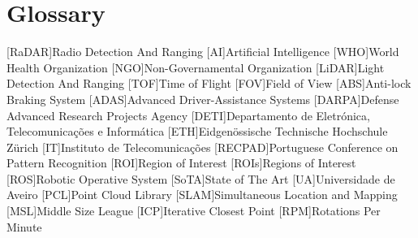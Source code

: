 \chapter{Glossary}

\footnotesize
\SingleSpacing

\begin{multicols}{2} 
\begin{acronym}[AAAAAA]
	[RaDAR]{Radio Detection And Ranging}
	[AI]{Artificial Intelligence}
	[WHO]{World Health Organization}
	[NGO]{Non-Governamental Organization} 
	[LiDAR]{Light Detection And Ranging}
	[TOF]{Time of Flight} 
	[FOV]{Field of View}
	[ABS]{Anti-lock Braking System}
	[ADAS]{Advanced Driver-Assistance Systems}
	[DARPA]{Defense Advanced Research Projects Agency}
	[DETI]{Departamento de Eletrónica, Telecomunicações e Informática}
	[ETH]{Eidgenössische Technische Hochschule Zürich}
	[IT]{Instituto de Telecomunicações}
	[RECPAD]{Portuguese Conference on Pattern Recognition}
	[ROI]{Region of Interest}
	[ROIs]{Regions of Interest}
	[ROS]{Robotic Operative System} 
	[SoTA]{State of The Art}
	[UA]{Universidade de Aveiro}
	[PCL]{Point Cloud Library}
	[SLAM]{Simultaneous Location and Mapping} 
	[MSL]{Middle Size League}
	[ICP]{Iterative Closest Point}
	[RPM]{Rotations Per Minute}
\end{acronym}
\end{multicols}


